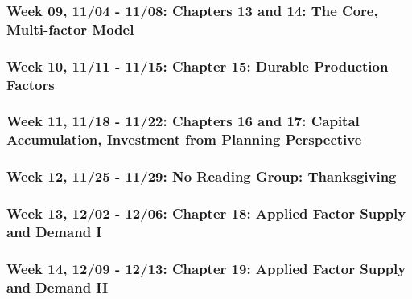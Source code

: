 \documentclass[11pt,]{article}
\begin{document}
\hypertarget{week-09-1104---1108-chapters-13-and-14-the-core-multi-factor-model}{%
\subsubsection*{Week 09, 11/04 - 11/08: Chapters 13 and 14: The Core, Multi-factor Model}\label{week-09-1104---1108-chapters-13-and-14-the-core-multi-factor-model}}

\hypertarget{week-10-1111---1115-chapter-15-durable-production-factors}{%
\subsubsection*{Week 10, 11/11 - 11/15: Chapter 15: Durable Production Factors}\label{week-10-1111---1115-chapter-15-durable-production-factors}}

\hypertarget{week-11-1118---1122-chapters-16-and-17-capital-accumulation-investment-from-planning-perspective}{%
\subsubsection*{Week 11, 11/18 - 11/22: Chapters 16 and 17: Capital Accumulation, Investment from Planning Perspective}\label{week-11-1118---1122-chapters-16-and-17-capital-accumulation-investment-from-planning-perspective}}

\hypertarget{week-12-1125---1129-no-reading-group-thanksgiving}{%
\subsubsection*{Week 12, 11/25 - 11/29: No Reading Group: Thanksgiving}\label{week-12-1125---1129-no-reading-group-thanksgiving}}

\hypertarget{week-13-1202---1206-chapter-18-applied-factor-supply-and-demand-i}{%
\subsubsection*{Week 13, 12/02 - 12/06: Chapter 18: Applied Factor Supply and Demand I}\label{week-13-1202---1206-chapter-18-applied-factor-supply-and-demand-i}}

\hypertarget{week-14-1209---1213-chapter-19-applied-factor-supply-and-demand-ii}{%
\subsubsection*{Week 14, 12/09 - 12/13: Chapter 19: Applied Factor Supply and Demand II}\label{week-14-1209---1213-chapter-19-applied-factor-supply-and-demand-ii}}
\end{document}
